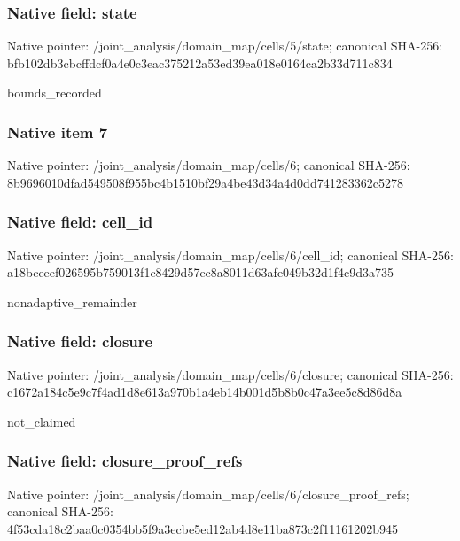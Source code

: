 \documentclass[10pt,a4paper]{article}
\begin{document}
\subsubsection{Native field: state}
Native pointer: /joint\_\allowbreak{}analysis/domain\_\allowbreak{}map/cells/5/state; canonical SHA-256: bfb102db3cbcffdcf0a4e0c3eac375212a53ed39ea018e0164ca2b33d711c834

\begingroup\raggedright\sloppy bounds\_\allowbreak{}recorded\par\endgroup

\subsubsection{Native item 7}
Native pointer: /joint\_\allowbreak{}analysis/domain\_\allowbreak{}map/cells/6; canonical SHA-256: 8b9696010dfad549508f955bc4b1510bf29a4be43d34a4d0dd741283362c5278

\subsubsection{Native field: cell\_\allowbreak{}id}
Native pointer: /joint\_\allowbreak{}analysis/domain\_\allowbreak{}map/cells/6/cell\_\allowbreak{}id; canonical SHA-256: a18bceeef026595b759013f1c8429d57ec8a8011d63afe049b32d1f4c9d3a735

\begingroup\raggedright\sloppy nonadaptive\_\allowbreak{}remainder\par\endgroup

\subsubsection{Native field: closure}
Native pointer: /joint\_\allowbreak{}analysis/domain\_\allowbreak{}map/cells/6/closure; canonical SHA-256: c1672a184c5e9c7f4ad1d8e613a970b1a4eb14b001d5b8b0c47a3ee5c8d86d8a

\begingroup\raggedright\sloppy not\_\allowbreak{}claimed\par\endgroup

\subsubsection{Native field: closure\_\allowbreak{}proof\_\allowbreak{}refs}
Native pointer: /joint\_\allowbreak{}analysis/domain\_\allowbreak{}map/cells/6/closure\_\allowbreak{}proof\_\allowbreak{}refs; canonical SHA-256: 4f53cda18c2baa0c0354bb5f9a3ecbe5ed12ab4d8e11ba873c2f11161202b945
\end{document}
